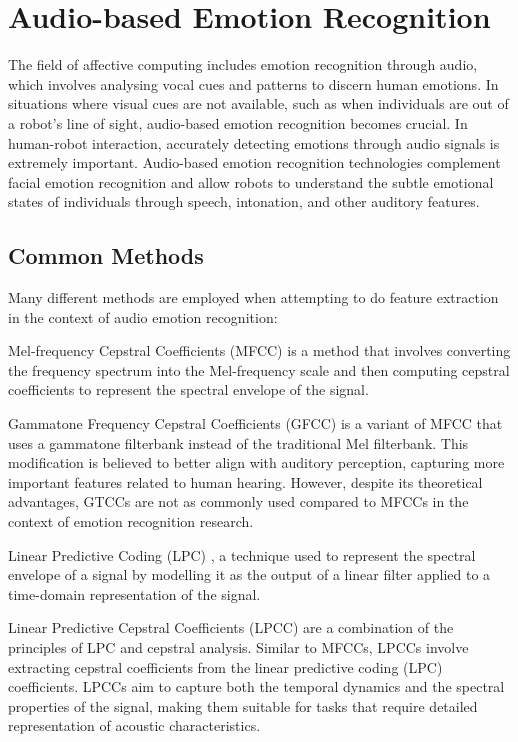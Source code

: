 \section{Audio-based Emotion Recognition}

The field of affective computing includes emotion recognition through audio, which involves analysing vocal cues and patterns to discern human emotions. In situations where visual cues are not available, such as when individuals are out of a robot's line of sight, audio-based emotion recognition becomes crucial. In human-robot interaction, accurately detecting emotions through audio signals is extremely important. Audio-based emotion recognition technologies complement facial emotion recognition and allow robots to understand the subtle emotional states of individuals through speech, intonation, and other auditory features.

\subsection{Common Methods}
Many different methods are employed when attempting to do feature extraction in the context of audio emotion recognition:

Mel-frequency Cepstral Coefficients (MFCC) \cite{Ali2021-ie} is a method that involves converting the frequency spectrum into the Mel-frequency scale and then computing cepstral coefficients to represent the spectral envelope of the signal.

Gammatone Frequency Cepstral Coefficients (GFCC) \cite{Shi2016-th} is a variant of MFCC that uses a gammatone filterbank instead of the traditional Mel filterbank. This modification is believed to better align with auditory perception, capturing more important features related to human hearing. However, despite its theoretical advantages, GTCCs are not as commonly used compared to MFCCs in the context of emotion recognition research.

Linear Predictive Coding (LPC) \cite{OShaughnessy1988-ws}, a technique used to represent the spectral envelope of a signal by modelling it as the output of a linear filter applied to a time-domain representation of the signal.

Linear Predictive Cepstral Coefficients (LPCC) \cite{6895780} are a combination of the principles of LPC and cepstral analysis. Similar to MFCCs, LPCCs involve extracting cepstral coefficients from the linear predictive coding (LPC) coefficients. LPCCs aim to capture both the temporal dynamics and the spectral properties of the signal, making them suitable for tasks that require detailed representation of acoustic characteristics.


